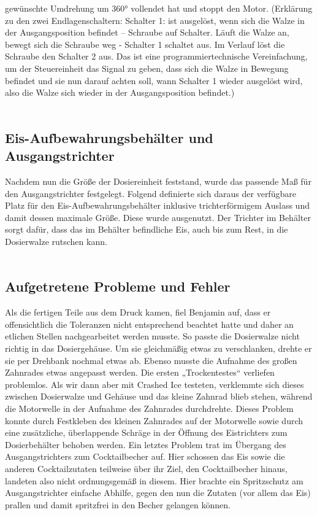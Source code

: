 \documentclass[10pt,a4paper]{report}
\begin{document}
	gewünschte Umdrehung um 360° vollendet hat und stoppt den Motor.
	(Erklärung zu den zwei Endlagenschaltern: Schalter 1: ist ausgelöst, wenn sich die Walze in der
	Ausgangsposition befindet – Schraube auf Schalter. Läuft die Walze an, bewegt sich die
	Schraube weg - Schalter 1 schaltet aus. Im Verlauf löst die Schraube den Schalter 2 aus. Das
	ist eine programmiertechnische Vereinfachung, um der Steuereinheit das Signal zu geben, dass
	sich die Walze in Bewegung befindet und sie nun darauf achten soll, wann Schalter 1 wieder
	ausgelöst wird, also die Walze sich wieder in der Ausgangsposition befindet.)\\ \\
	
	\subsection{Eis-Aufbewahrungsbehälter und Ausgangstrichter}
	Nachdem nun die Größe der Dosiereinheit feststand, wurde das passende Maß für den Ausgangstrichter festgelegt. Folgend definierte sich daraus der verfügbare Platz für den Eis-Aufbewahrungsbehälter inklusive trichterförmigem Auslass und damit dessen maximale Größe. Diese wurde ausgenutzt.
	Der Trichter im Behälter sorgt dafür, dass das im Behälter befindliche Eis, auch bis zum Rest, in die Dosierwalze rutschen kann.\\ \\
	\newpage
	
	\subsection{Aufgetretene Probleme und Fehler}
	Als die fertigen Teile aus dem Druck kamen, fiel Benjamin auf, dass er offensichtlich die
	Toleranzen nicht entsprechend beachtet hatte und daher an etlichen Stellen nachgearbeitet
	werden musste. So passte die Dosierwalze nicht richtig in das Dosiergehäuse. Um sie
	gleichmäßig etwas zu verschlanken, drehte er sie per Drehbank nochmal etwas ab.
	Ebenso musste die Aufnahme des großen Zahnrades etwas angepasst werden.
	Die ersten „Trockentestes“ verliefen problemlos. Als wir dann aber mit Crashed Ice testeten,
	verklemmte sich dieses zwischen Dosierwalze und Gehäuse und das kleine Zahnrad blieb
	stehen, während die Motorwelle in der Aufnahme des Zahnrades durchdrehte. Dieses Problem
	konnte durch Festkleben des kleinen Zahnrades auf der Motorwelle sowie durch eine
	zusätzliche, überlappende Schräge in der Öffnung des Eistrichters zum Dosierbehälter
	behoben werden.
	Ein letztes Problem trat im Übergang des Ausgangstrichters zum Cocktailbecher auf. Hier
	schossen das Eis sowie die anderen Cocktailzutaten teilweise über ihr Ziel, den Cocktailbecher
	hinaus, landeten also nicht ordnungsgemäß in diesem. Hier brachte ein Spritzschutz am
	Ausgangstrichter einfache Abhilfe, gegen den nun die Zutaten (vor allem das Eis) prallen und
	damit spritzfrei in den Becher gelangen können.\\ \\
	
\end{document}
